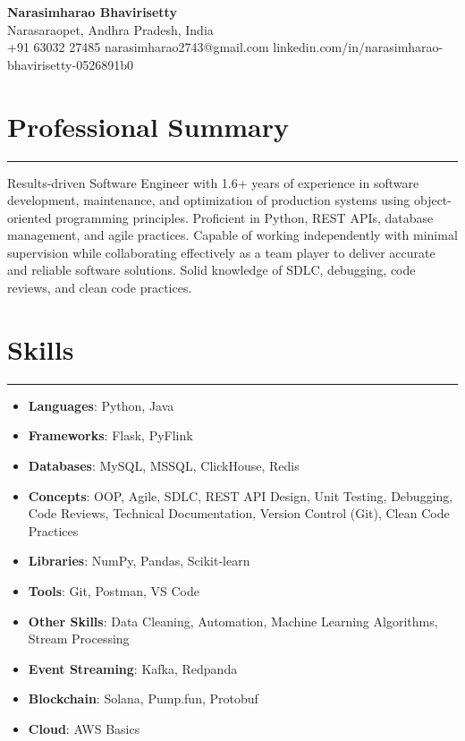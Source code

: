 \documentclass[12pt]{article}
\begin{document}
\begin{center}
  {\huge\textbf{Narasimharao Bhavirisetty}}\\[3pt]
  Narasaraopet, Andhra Pradesh, India \\[1pt]
  +91 63032 27485 \textbullet{} narasimharao2743@gmail.com \textbullet{}
  linkedin.com/in/narasimharao-bhavirisetty-0526891b0
\end{center}

\vspace{6pt}

\section*{Professional Summary}
\vspace{1pt}\hrule\vspace{4pt}
Results-driven Software Engineer with 1.6+ years of experience in software development, maintenance, and optimization of production systems using object-oriented programming principles. Proficient in Python, REST APIs, database management, and agile practices. Capable of working independently with minimal supervision while collaborating effectively as a team player to deliver accurate and reliable software solutions. Solid knowledge of SDLC, debugging, code reviews, and clean code practices.

\section*{Skills}
\vspace{1pt}\hrule\vspace{4pt}
\begin{itemize}
  \item \textbf{Languages}: Python, Java
  \item \textbf{Frameworks}: Flask, PyFlink
  \item \textbf{Databases}: MySQL, MSSQL, ClickHouse, Redis
  \item \textbf{Concepts}: OOP, Agile, SDLC, REST API Design, Unit Testing, Debugging, Code Reviews, Technical Documentation, Version Control (Git), Clean Code Practices
  \item \textbf{Libraries}: NumPy, Pandas, Scikit-learn
  \item \textbf{Tools}: Git, Postman, VS Code
  \item \textbf{Other Skills}: Data Cleaning, Automation, Machine Learning Algorithms, Stream Processing
  \item \textbf{Event Streaming}: Kafka, Redpanda
  \item \textbf{Blockchain}: Solana, Pump.fun, Protobuf
  \item \textbf{Cloud}: AWS Basics
\end{itemize}
\end{document}
